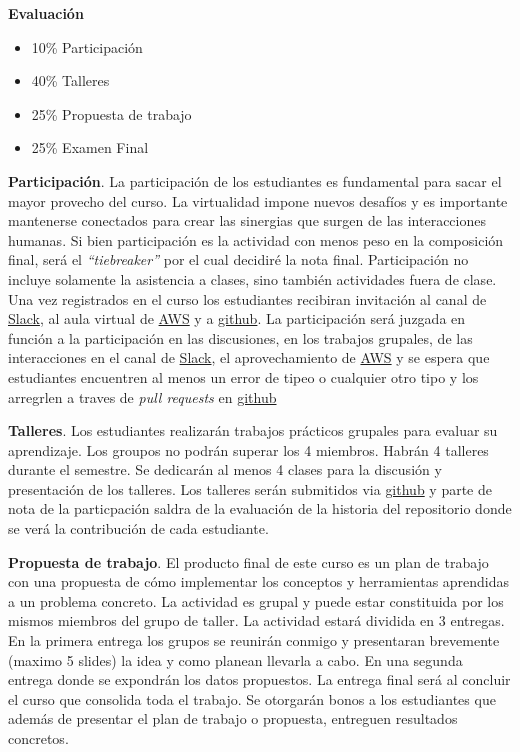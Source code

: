 \documentclass[11pt]{article}
\begin{document}
\bigskip


{\bf \Large Evaluación}
\medskip
\begin{itemize}
	\item 10\% Participación
	\item 40\% Talleres
	\item 25\% Propuesta de trabajo
	\item 25\% Examen Final
\end{itemize}


{\bf Participación}. La participación de los estudiantes es fundamental para sacar el mayor provecho del curso. La virtualidad impone nuevos desafíos y es importante mantenerse conectados para crear las sinergias que surgen de las interacciones humanas. Si bien participación es la actividad con menos peso en la composición final, será el {\it ``tiebreaker''} por el cual decidiré la nota final. Participación no incluye solamente la asistencia a clases, sino también actividades fuera de clase. Una vez registrados en el curso los estudiantes recibiran invitación al canal de \href{https://slack.com/}{Slack}, al aula virtual de \href{https://aws.amazon.com/education/awseducate/}{AWS} y a \href{https://github.com/ECON-4676-UNIANDES}{github}. La participación será juzgada en función a la participación en las discusiones, en los trabajos grupales, de las interacciones en el canal de \href{https://slack.com/}{Slack}, el aprovechamiento de \href{https://aws.amazon.com/education/awseducate/}{AWS} y se espera que estudiantes encuentren al menos un error de tipeo o cualquier otro tipo y los arregrlen a traves de {\it pull requests} en \href{https://github.com/ECON-4676-UNIANDES}{github}


{\bf Talleres}.  Los estudiantes realizarán trabajos prácticos grupales para evaluar su aprendizaje. Los groupos no podrán superar los 4 miembros. Habrán 4 talleres durante el semestre. Se dedicarán al menos 4 clases para la discusión y presentación de los talleres. Los talleres serán submitidos via \href{https://github.com/ECON-4676-UNIANDES}{github} y parte de nota de la particpación saldra de la evaluación de la historia del repositorio donde se verá la contribución de cada estudiante.


{\bf Propuesta de trabajo}. El producto final de este curso es un plan de trabajo con una propuesta de cómo implementar los conceptos y herramientas aprendidas a un problema concreto. La actividad es grupal y puede estar constituida por los mismos miembros del grupo de taller. La actividad estará dividida en 3 entregas. En la primera entrega los grupos se reunirán conmigo y presentaran brevemente (maximo 5 slides) la idea y como planean llevarla a cabo. En una segunda entrega donde se expondrán los datos propuestos. La entrega final será al concluir el curso que consolida toda el trabajo. Se otorgarán bonos a los estudiantes que además de presentar el plan de trabajo o propuesta, entreguen resultados concretos.
\end{document}
